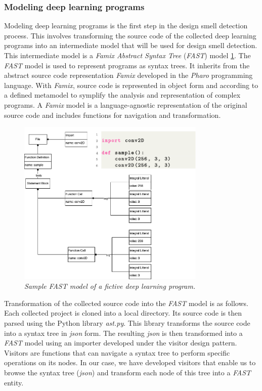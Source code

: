 \subsubsection{Modeling deep learning programs}
\label{sec:modelingDeepLearningPrograms}
Modeling deep learning programs is the first step in the design smell detection process. This involves transforming the source code of the collected deep learning programs into an intermediate model that will be used for design smell detection. This intermediate model is a \emph{Famix Abstract Syntax Tree} (\emph{FAST}) model \ref{fig:fast}. The \emph{FAST} model is used to represent programs as syntax trees. It inherits from the abstract source code representation \emph{Famix} developed in the \emph{Pharo} programming language. With \emph{Famix}, source code is represented in object form and according to a defined metamodel to symplify the analysis and representation of complex programs. A \emph{Famix} model is a language-agnostic representation of the original source code and includes functions for navigation and transformation.\\

\begin{figure}[h]
  \centering
  \includegraphics[width=0.8\textwidth]{figure/fast.png}
  \caption{\emph{Sample \emph{FAST} model of a fictive deep learning program.}}
  \label{fig:fast}
\end{figure}

Transformation of the collected source code into the \emph{FAST} model is as follows. Each collected project is cloned into a local directory. Its source code is then parsed using the Python library \emph{ast.py}. This library transforms the source code into a syntax tree in \emph{json} form. The resulting \emph{json} is then transformed into a \emph{FAST} model using an importer developed under the visitor design pattern. Visitors are functions that can navigate a syntax tree to perform specific operations on its nodes. In our case, we have developed visitors that enable us to browse the syntax tree (\emph{json}) and transform each node of this tree into a \emph{FAST} entity.\\

